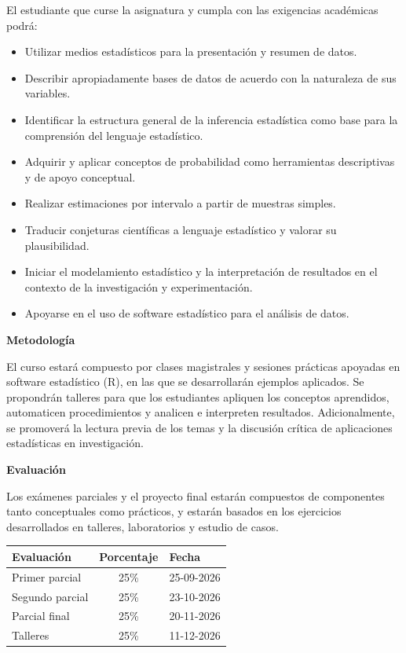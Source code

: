 \documentclass[12pt]{article}
\begin{document}
El estudiante que curse la asignatura y cumpla con las exigencias académicas podrá:
\begin{itemize}
    \item Utilizar medios estadísticos para la presentación y resumen de datos.
    \item Describir apropiadamente bases de datos de acuerdo con la naturaleza de sus variables.
    \item Identificar la estructura general de la inferencia estadística como base para la comprensión del lenguaje estadístico.
    \item Adquirir y aplicar conceptos de probabilidad como herramientas descriptivas y de apoyo conceptual.
    \item Realizar estimaciones por intervalo a partir de muestras simples.
    \item Traducir conjeturas científicas a lenguaje estadístico y valorar su plausibilidad.
    \item Iniciar el modelamiento estadístico y la interpretación de resultados en el contexto de la investigación y experimentación.
    \item Apoyarse en el uso de software estadístico para el análisis de datos.
\end{itemize}

\vspace{1em}

\textbf{\large Metodología}

El curso estará compuesto por clases magistrales y sesiones prácticas apoyadas en software estadístico (R), en las que se desarrollarán ejemplos aplicados. Se propondrán talleres para que los estudiantes apliquen los conceptos aprendidos, automaticen procedimientos y analicen e interpreten resultados. Adicionalmente, se promoverá la lectura previa de los temas y la discusión crítica de aplicaciones estadísticas en investigación.

\vspace{1em}

\textbf{\large Evaluación}

Los exámenes parciales y el proyecto final estarán compuestos de componentes tanto conceptuales como prácticos, y estarán basados en los ejercicios desarrollados en talleres, laboratorios y estudio de casos.

\begin{table}[h]
\centering
\begin{tabular}{l c l}
\hline
\textbf{Evaluación} & \textbf{Porcentaje} & \textbf{Fecha} \\
\hline
Primer parcial & 25\% & 25-09-2026 \\
Segundo parcial & 25\% & 23-10-2026 \\
Parcial final & 25\% & 20-11-2026 \\
Talleres & 25\% & 11-12-2026 \\
\hline
\end{tabular}
\end{table}
\end{document}
